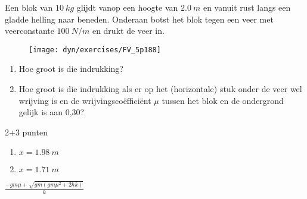 
\begin{exercise}




Een blok van $\SI{10}{kg}$ glijdt vanop een hoogte van $\SI{2,0}{m}$ en vanuit rust langs een gladde helling naar beneden. Onderaan botst het blok tegen een veer met veerconstante $\SI{100}{N/m}$ en drukt de veer in.
\begin{figure}[h]
\centering
\texttt{[image: dyn/exercises/FV\_5p188]}
\end{figure}
\begin{enumerate}
\item Hoe groot is die indrukking?
\item Hoe groot is die indrukking als er op het (horizontale) stuk onder de veer wel wrijving is en de wrijvingsco\"effici\"ent $\mu$ tussen het blok en de ondergrond gelijk is aan 0,30?
\end{enumerate}

\begin{oplossing}
2+3 punten

\begin{enumerate}
	\item $x=\SI{1,98}{m}$
	\item $x=\SI{1,71}{m}$
\end{enumerate}
$\displaystyle\frac{- g m \mu + \sqrt{g m \left(g m \mu^{2} + 2 h k\right)}}{k}$
\end{oplossing}

\end{exercise}
